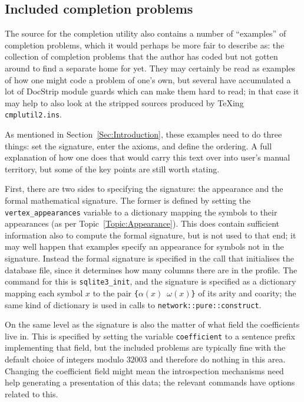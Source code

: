 \documentclass{article}
\theoremstyle{definition}
\begin{document}
\subsection{Included completion problems}

The source for the completion utility also contains a number of 
``examples'' of completion problems, which it would perhaps be more 
fair to describe as: the collection of completion problems that the 
author has coded but not gotten around to find a separate home for 
yet. They may certainly be read as examples of how one might code a 
problem of one's own, but several have accumulated a lot of 
\textsf{DocStrip} module guards which can make them hard to read; in 
that case it may help to also look at the stripped sources produced 
by \TeX ing \texttt{cmplutil2.ins}.

As mentioned in Section~\ref{Sec:Introduction}, these examples need 
to do three things: set the signature, enter the axioms, and define 
the ordering. A full explanation of how one does that would carry 
this text over into user's manual territory, but some of the key 
points are still worth stating.

First, there are two sides to specifying the signature: the 
appearance and the formal mathematical signature. The former is 
defined by setting the \verb|vertex_appearances| variable to a 
dictionary mapping the symbols to their appearances (as per 
Topic~\ref{Topic:Appearance}). This does contain sufficient 
information also to compute the formal signature, but is not used to 
that end; it may well happen that examples specify an appearance for 
symbols not in the signature. Instead the formal signature is 
specified in the call that initialises the database file, since it 
determines how many columns there are in the profile. The command for 
this is \verb|sqlite3_init|, and the signature is specified as a 
dictionary mapping each symbol $x$ to the pair 
\verb|{|$\alpha(x)$~$\omega(x)$\verb|}| of its arity and coarity; the 
same kind of dictionary is used in calls to 
\texttt{network::pure::construct}.

On the same level as the signature is also the matter of what field 
the coefficients live in. This is specified by setting the variable 
\verb|coefficient| to a sentence prefix implementing that field, but 
the included problems are typically fine with the default choice of 
integers modulo $32003$ and therefore do nothing in this area. 
Changing the coefficient field might mean the introspection mechanisms 
need help generating a presentation of this data; the relevant 
commands have options related to this.
\end{document}
